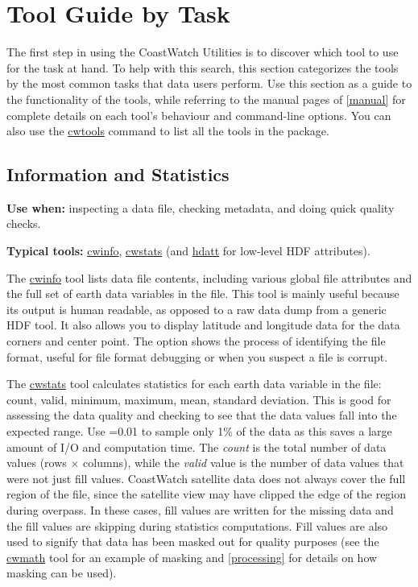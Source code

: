 \chapter{Tool Guide by Task}
\label{common}

The first step in using the CoastWatch Utilities is to discover which
tool to use for the task at hand.  To help with this search, this
section categorizes the tools by the most common tasks that data users
perform.  Use this section as a guide to the functionality
of the tools, while referring to the manual pages of \autoref{manual}
for complete details on each tool's behaviour and command-line
options.  You can also use the \hyperlink{cwtools}{cwtools} command to
list all the tools in the package.

\section{Information and Statistics}

\noindent\textbf{Use when:} inspecting a data file, checking metadata, and doing quick quality checks.\par
\noindent\textbf{Typical tools:} \hyperlink{cwinfo}{cwinfo}, \hyperlink{cwstats}{cwstats} (and \hyperlink{hdatt}{hdatt} for low-level HDF attributes).\par

The \hyperlink{cwinfo}{cwinfo} tool lists data file contents,
including various global file attributes and the full set of
earth data variables in the file.  This tool is mainly useful
because its output is human readable, as opposed to a raw data
dump from a generic HDF tool.  It also allows you to display
latitude and longitude data for the data corners and center
point.  The  option shows the process of
identifying the file format, useful for file format debugging or
when you suspect a file is corrupt.

The \hyperlink{cwstats}{cwstats} tool calculates statistics for
each earth data variable in the file: count, valid, minimum,
maximum, mean, standard deviation.  This is good for assessing
the data quality and checking to see that the data values fall
into the expected range.  Use =0.01 to sample
only 1\% of the data as this saves a large amount of I/O and
computation time.  The {\em count} is the total number of data
values (rows $\times$ columns), while the {\em valid} value is
the number of data values that were not just fill values.
CoastWatch satellite data does not always cover the full region
of the file, since the satellite view may have clipped the edge
of the region during overpass.  In these cases, fill values are
written for the missing data and the fill values are skipping
during statistics computations.  Fill values are also used to
signify that data has been masked out for quality purposes (see
the \hyperlink{cwmath}{cwmath} tool for an example of masking and
\autoref{processing} for details on how masking can be used).

